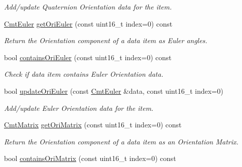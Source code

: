 \begin{DoxyCompactItemize}
\begin{DoxyCompactList}\small\item\em \-Add/update \-Quaternion \-Orientation data for the item. \end{DoxyCompactList}\item 
\hyperlink{structCmtEuler}{\-Cmt\-Euler} \hyperlink{classxsens_1_1Packet_a28f872974abdcd50c053937df13c1d76}{get\-Ori\-Euler} (const uint16\-\_\-t index=0) const 
\begin{DoxyCompactList}\small\item\em \-Return the \-Orientation component of a data item as \-Euler angles. \end{DoxyCompactList}\item 
\hypertarget{classxsens_1_1Packet_af419eef5f9b8987174d64333dae64663}{bool \hyperlink{classxsens_1_1Packet_af419eef5f9b8987174d64333dae64663}{contains\-Ori\-Euler} (const uint16\-\_\-t index=0) const }\label{classxsens_1_1Packet_af419eef5f9b8987174d64333dae64663}

\begin{DoxyCompactList}\small\item\em \-Check if data item contains \-Euler \-Orientation data. \end{DoxyCompactList}\item 
\hypertarget{classxsens_1_1Packet_a8e0acea10ff705ef563941e3b9741395}{bool \hyperlink{classxsens_1_1Packet_a8e0acea10ff705ef563941e3b9741395}{update\-Ori\-Euler} (const \hyperlink{structCmtEuler}{\-Cmt\-Euler} \&data, const uint16\-\_\-t index=0)}\label{classxsens_1_1Packet_a8e0acea10ff705ef563941e3b9741395}

\begin{DoxyCompactList}\small\item\em \-Add/update \-Euler \-Orientation data for the item. \end{DoxyCompactList}\item 
\hyperlink{structCmtMatrix}{\-Cmt\-Matrix} \hyperlink{classxsens_1_1Packet_a306ec52e00e06924f634cd0e17474e7e}{get\-Ori\-Matrix} (const uint16\-\_\-t index=0) const 
\begin{DoxyCompactList}\small\item\em \-Return the \-Orientation component of a data item as an \-Orientation \-Matrix. \end{DoxyCompactList}\item 
\hypertarget{classxsens_1_1Packet_af51b136cb132b8032751707c4228b2f6}{bool \hyperlink{classxsens_1_1Packet_af51b136cb132b8032751707c4228b2f6}{contains\-Ori\-Matrix} (const uint16\-\_\-t index=0) const }\label{classxsens_1_1Packet_af51b136cb132b8032751707c4228b2f6}


\end{DoxyCompactItemize}
